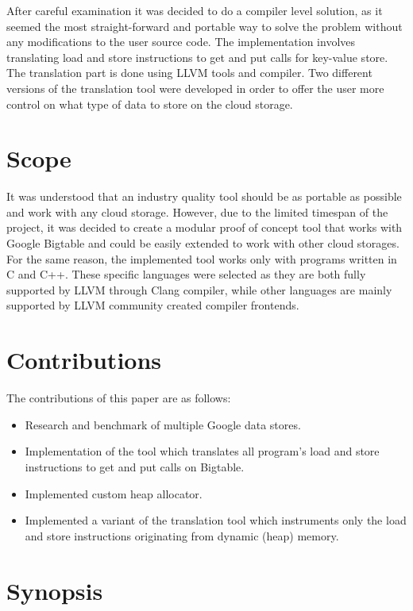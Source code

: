 \documentclass[bsc,frontabs,twoside,singlespacing,parskip,deptreport]{infthesis}     %
\begin{document}
After careful examination it was decided to do a compiler level solution, as it seemed the most straight-forward and portable way to solve the problem without any modifications to the user source code. The implementation involves translating load and store instructions to get and put calls for key-value store. The translation part is done using LLVM tools and compiler. Two different versions of the translation tool were developed in order to offer the user more control on what type of data to store on the cloud storage.

\section{Scope}

It was understood that an industry quality tool should be as portable as possible and work with any cloud storage. However, due to the limited timespan of the project, it was decided to create a modular proof of concept tool that works with Google Bigtable and could be easily extended to work with other cloud storages. For the same reason, the implemented tool works only with programs written in C and C++. These specific languages were selected as they are both fully supported by LLVM through Clang compiler, while other languages are mainly supported by LLVM community created compiler frontends.

\section{Contributions}

The contributions of this paper are as follows:
\begin{itemize}
\item
Research and benchmark of multiple Google data stores.
\item
Implementation of the tool which translates all program's load and store instructions to get and put calls on Bigtable.
\item
Implemented custom heap allocator.
\item
Implemented a variant of the translation tool which instruments only the load and store instructions originating from dynamic (heap) memory.
\end{itemize}

\section{Synopsis}
\end{document}
